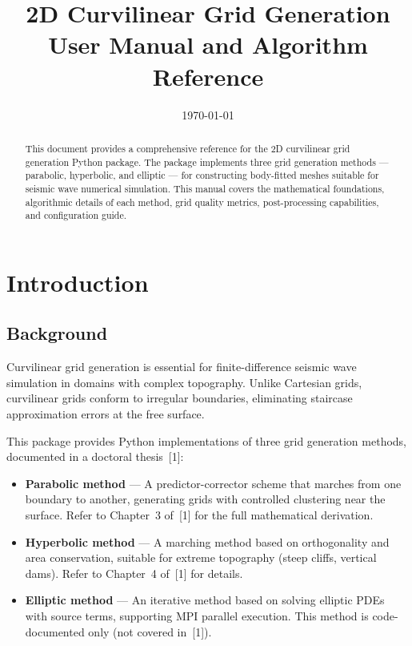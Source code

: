 \documentclass[11pt,a4paper]{report}
\title{\textbf{2D Curvilinear Grid Generation}\\[0.5em]
\large User Manual and Algorithm Reference}
\author{}
\date{\today}
\begin{document}
\maketitle

\begin{abstract}
This document provides a comprehensive reference for the 2D curvilinear grid generation Python package. The package implements three grid generation methods --- parabolic, hyperbolic, and elliptic --- for constructing body-fitted meshes suitable for seismic wave numerical simulation. This manual covers the mathematical foundations, algorithmic details of each method, grid quality metrics, post-processing capabilities, and configuration guide.
\end{abstract}

\tableofcontents

\chapter{Introduction}

\section{Background}

Curvilinear grid generation is essential for finite-difference seismic wave simulation in domains with complex topography. Unlike Cartesian grids, curvilinear grids conform to irregular boundaries, eliminating staircase approximation errors at the free surface.

This package provides Python implementations of three grid generation methods, documented in a doctoral thesis~[1]:

\begin{itemize}
    \item \textbf{Parabolic method} --- A predictor-corrector scheme that marches from one boundary to another, generating grids with controlled clustering near the surface. Refer to Chapter~3 of~[1] for the full mathematical derivation.
    \item \textbf{Hyperbolic method} --- A marching method based on orthogonality and area conservation, suitable for extreme topography (steep cliffs, vertical dams). Refer to Chapter~4 of~[1] for details.
    \item \textbf{Elliptic method} --- An iterative method based on solving elliptic PDEs with source terms, supporting MPI parallel execution. This method is code-documented only (not covered in~[1]).
\end{itemize}
\end{document}
